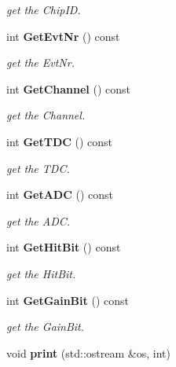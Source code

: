\begin{DoxyCompactItemize}
\begin{DoxyCompactList}\small\item\em get the Chip\-I\-D. \end{DoxyCompactList}\item 
int {\bf Get\-Evt\-Nr} () const \label{classCALICE_1_1LabviewBlock2_a8d4a67989cad5bf504971abc612653cc}

\begin{DoxyCompactList}\small\item\em get the Evt\-Nr. \end{DoxyCompactList}\item 
int {\bf Get\-Channel} () const \label{classCALICE_1_1LabviewBlock2_a9636e5feb9a0cba799067f7b2390d25b}

\begin{DoxyCompactList}\small\item\em get the Channel. \end{DoxyCompactList}\item 
int {\bf Get\-T\-D\-C} () const \label{classCALICE_1_1LabviewBlock2_a57d069ac572fbc56de3abfaaa007eb6e}

\begin{DoxyCompactList}\small\item\em get the T\-D\-C. \end{DoxyCompactList}\item 
int {\bf Get\-A\-D\-C} () const \label{classCALICE_1_1LabviewBlock2_ab3d5c72af2f3fa8dd180afb091455dee}

\begin{DoxyCompactList}\small\item\em get the A\-D\-C. \end{DoxyCompactList}\item 
int {\bf Get\-Hit\-Bit} () const \label{classCALICE_1_1LabviewBlock2_a98de016fe2fa0639ca0cc82b1eecf97f}

\begin{DoxyCompactList}\small\item\em get the Hit\-Bit. \end{DoxyCompactList}\item 
int {\bf Get\-Gain\-Bit} () const \label{classCALICE_1_1LabviewBlock2_a08c27201d04e385c9be5709ce2fb9525}

\begin{DoxyCompactList}\small\item\em get the Gain\-Bit. \end{DoxyCompactList}\item 
void {\bf print} (std\-::ostream \&os, int)\label{classCALICE_1_1LabviewBlock2_a7cb31b570b9ba0054b44af4ef8402158}


\end{DoxyCompactItemize}
